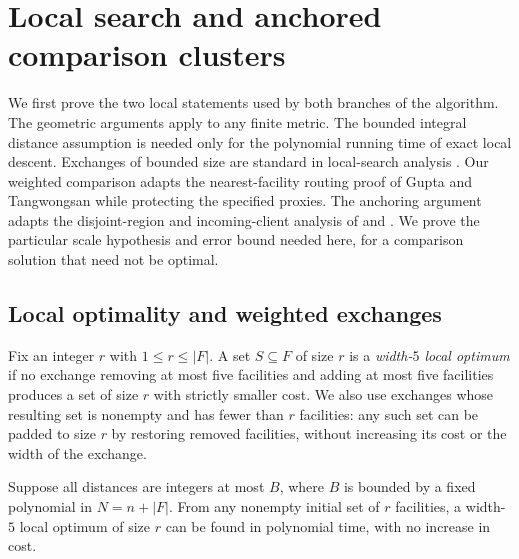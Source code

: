 \section{Local search and anchored comparison clusters}
\label{loc:section}

We first prove the two local statements used by both branches of the
algorithm.  The geometric arguments apply to any finite metric.  The bounded
integral distance assumption is needed only for the polynomial running time
of exact local descent.
Exchanges of bounded size are standard in local-search analysis
\cite[Sections~3.3--3.4]{Arya2004}.  Our weighted comparison adapts the
nearest-facility routing proof of Gupta and Tangwongsan
\cite{GuptaTangwongsan2008} while protecting the specified proxies.
The anchoring argument adapts the disjoint-region and incoming-client
analysis of \cite{CohenAddadSchwiegelshohn2017} and
\cite[Section~4.1.1]{CGLSS2026}.  We prove the particular scale
hypothesis and error bound needed here, for a comparison solution that
need not be optimal.

\subsection{Local optimality and weighted exchanges}

Fix an integer $r$ with $1\le r\le |F|$.  A set $S\subseteq F$ of size $r$
is a \emph{width-$5$ local optimum} if no exchange removing at most five
facilities and adding at most five facilities produces a set of size $r$
with strictly smaller cost.  We also use exchanges whose resulting set is
nonempty and has fewer than $r$ facilities: any such set can be padded to
size $r$ by restoring removed facilities, without increasing its cost or
the width of the exchange.

\begin{lemma}
\label{loc:descent}
Suppose all distances are integers at most $B$, where $B$ is bounded by a
fixed polynomial in $N=n+|F|$.  From any nonempty initial set of $r$
facilities, a width-$5$ local optimum of size $r$ can be found in polynomial
time, with no increase in cost.
\end{lemma}

